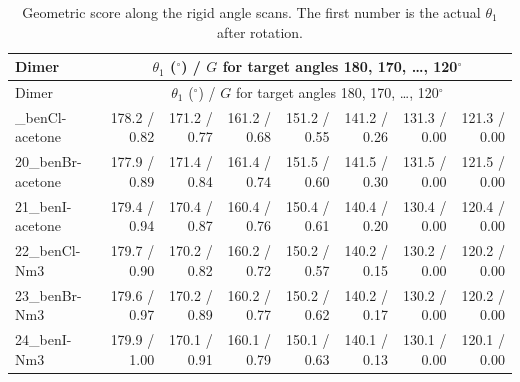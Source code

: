 {\scriptsize
\setlength{\tabcolsep}{3pt}
\begin{longtable}{lrrrrrrr}
\caption{Geometric score along the rigid angle scans. The first number is the actual $\theta_1$ after rotation.}\label{tab:scana}\\
\toprule
Dimer & \multicolumn{7}{c}{$\theta_1$ ($^\circ$) / $G$ for target angles 180, 170, \ldots, 120$^\circ$}\\
\midrule
\endfirsthead
\toprule
Dimer & \multicolumn{7}{c}{$\theta_1$ ($^\circ$) / $G$ for target angles 180, 170, \ldots, 120$^\circ$}\\
\midrule
\endhead
\bottomrule
\endlastfoot
19\_benCl-acetone & 178.2 / 0.82 & 171.2 / 0.77 & 161.2 / 0.68 & 151.2 / 0.55 & 141.2 / 0.26 & 131.3 / 0.00 & 121.3 / 0.00\\
20\_benBr-acetone & 177.9 / 0.89 & 171.4 / 0.84 & 161.4 / 0.74 & 151.5 / 0.60 & 141.5 / 0.30 & 131.5 / 0.00 & 121.5 / 0.00\\
21\_benI-acetone & 179.4 / 0.94 & 170.4 / 0.87 & 160.4 / 0.76 & 150.4 / 0.61 & 140.4 / 0.20 & 130.4 / 0.00 & 120.4 / 0.00\\
22\_benCl-Nm3 & 179.7 / 0.90 & 170.2 / 0.82 & 160.2 / 0.72 & 150.2 / 0.57 & 140.2 / 0.15 & 130.2 / 0.00 & 120.2 / 0.00\\
23\_benBr-Nm3 & 179.6 / 0.97 & 170.2 / 0.89 & 160.2 / 0.77 & 150.2 / 0.62 & 140.2 / 0.17 & 130.2 / 0.00 & 120.2 / 0.00\\
24\_benI-Nm3 & 179.9 / 1.00 & 170.1 / 0.91 & 160.1 / 0.79 & 150.1 / 0.63 & 140.1 / 0.13 & 130.1 / 0.00 & 120.1 / 0.00\\
\end{longtable}}
